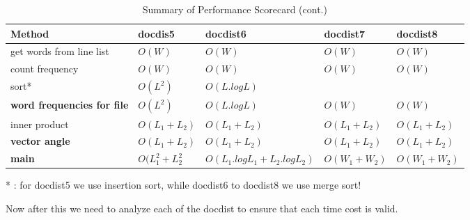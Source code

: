 \documentclass{article}
\begin{document}
    \begin{table}[h]
        \centering
        \captionsetup{labelformat=empty}
        \caption{Summary of Performance Scorecard (cont.)}
        \begin{tabular}{|p{3cm}|l|l|l|l|} 
        \hline
        Method                             & docdis5           & docdist6                         & docdist7       & docdist8        \\ 
        \hline
        get words from line list           & $O(W)$            & $O(W)$                           & $O(W)$         & $O(W)$          \\ 
        \hline
        count frequency                    & $O(W)$            & $O(W)$                           & $O(W)$         & $O(W)$          \\ 
        \hline
        sort*      & $O(L^2)$          & \textbf{$O(L.log L)$}            &                &                 \\ 
        \hline
        \textbf{word frequencies for file} & $O(L^2)$          & $O(L. log L)$                    & $O(W)$         & $O(W)$          \\ 
        \hline
        inner product                      & $O(L_1 + L_2)$    & $O(L_1 + L_2)$                   & $O(L_1 + L_2)$ & $O(L_1 + L_2)$  \\ 
        \hline
        \textbf{vector angle}              & $O(L_1 + L_2)$    & $O(L_1 + L_2)$                   & $O(L_1 + L_2)$ & $O(L_1 + L_2)$  \\ 
        \hline
        \textbf{main}                      & $O(L_1^2 + L_2^2$ & $O(L_1. log L_1 + L_2. log L_2)$ & $O(W_1 + W_2)$ & $O(W_1 + W_2)$  \\
        \hline
        \end{tabular}
    \end{table}
    * : for docdist5 we use insertion sort, while docdist6 to docdist8 we use merge sort!
    
    Now after this we need to analyze each of the docdist to ensure that each time cost is valid.
\end{document}
